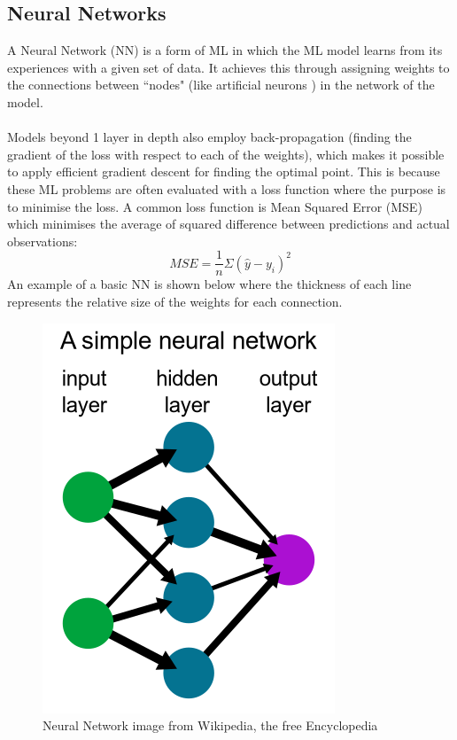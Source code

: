 \subsection{Neural Networks}
A Neural Network (NN) is a form of ML in which the ML model learns from its experiences with a given set of data. 
It achieves this through assigning weights to the connections between ``nodes" (like artificial neurons \cite{neurons}) in the network of the model. 
\\ \\
Models beyond 1 layer in depth also employ back-propagation (finding the gradient of the loss with respect to each of the weights), which makes it possible to apply efficient gradient descent for finding the optimal point. 
This is because these ML problems are often evaluated with a loss function where the purpose is to minimise the loss. 
A common loss function is Mean Squared Error (MSE) which minimises the average of squared difference between predictions and actual observations:
\begin{equation}
    MSE = \dfrac{1}{n} \Sigma (\hat{y} - y_i)^2
\end{equation}
An example of a basic NN is shown below where the thickness of each line represents the relative size of the weights for each connection.
\begin{figure}[htbp]
	\centering
    \includegraphics[scale=0.3]{background/neural_network.png}
	\caption{Neural Network image from Wikipedia, the free Encyclopedia}
	\label{fig:nn}
\end{figure}

